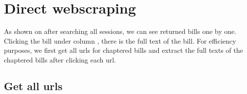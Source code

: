 \documentclass[letterpaper,10pt,english]{jupyterBook}
\begin{document}
\section{Direct webscraping}
\label{\detokenize{ch7:direct-webscraping}}
\sphinxAtStartPar
As shown on  after searching all sessions, we can see returned bills one by one. Clicking the bill under column , there is the full text of the bill. For efficiency purposes, we first get all urls for chaptered bills and extract the full texts of the chaptered bills after clicking each url.


\subsection{Get all urls}
\label{\detokenize{ch7:get-all-urls}}
\end{document}
